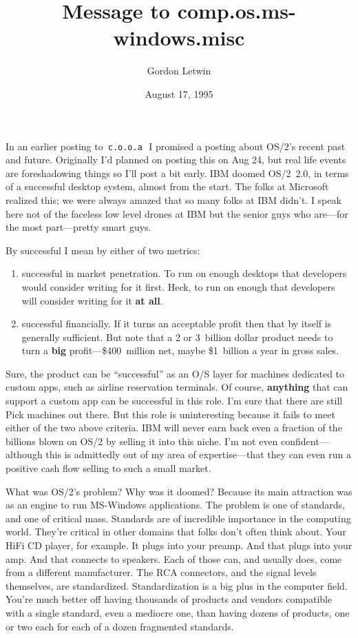 \documentclass[12pt,letterpaper]{article}
\title{Message to comp.os.ms-windows.misc}
\author{Gordon Letwin}
\date{August 17, 1995}
\newcommand{\newsgrp}{\,\texttt{c.o.o.a}\,}
\newcommand{\acro}[1]{{\small\MakeUppercase#1\spacefactor1000}}
\begin{document}
\maketitle

In an earlier posting to \newsgrp\ I promised a posting about \acro{OS/2}'s
recent past and future.  Originally I'd planned on posting this on Aug 24,
but real life events are foreshadowing things so I'll post a bit early.
\acro{IBM} doomed \acro{OS/2}~2.0, in terms of a successful desktop system, almost from
the start.  The folks at Microsoft realized this; we were always amazed
that so many folks at \acro{IBM} didn't.  I speak here not of the faceless low
level drones at \acro{IBM} but the senior guys who are---for the most part---pretty
smart guys.

By successful I mean by either of two metrics:
\begin{enumerate}
\item successful in market penetration.  To run on enough desktops        
                that developers would consider writing for it first.
                Heck, to run on enough that developers will consider writing
                for it {\bfseries at all}.
\item successful financially.  If it turns an acceptable profit then
                that by itself is generally sufficient.  But note that a
                2 or 3~billion dollar product needs to turn a {\bfseries big}
                profit---\$400~million net, maybe \$1~billion a year in
                gross sales.
\end{enumerate}
Sure, the product can be ``successful'' as an O/S layer for machines dedicated
to custom apps, such as airline reservation terminals.  Of course, 
{\bfseries anything} that can support a custom app can be successful in this role.  
I'm sure that there are still Pick machines out there.  But this role
is uninteresting because it fails to meet either of the two above criteria.
\acro{IBM} will never earn back even a fraction of the billions blown on \acro{OS/2}
by selling it into this niche.  I'm not even confident---although this
is admittedly out of my area of expertise---that they can even run a 
positive cash flow selling to such a small market.

What was \acro{OS/2}'s problem?  Why was it doomed?  Because its main attraction
was as an engine to run MS-Windows applications.  The problem is one of
standards, and one of critical mass.  Standards are of incredible importance
in the computing world.  They're critical in other domains that folks
don't often think about.  Your HiFi CD player, for example.  It plugs into
your preamp.  And that plugs into your amp.  And that connects to speakers.
Each of those can, and usually does, come from a different manufacturer.
The \acro{RCA} connectors, and the signal levels themselves, are standardized.
Standardization is a big plus in the computer field.  You're much better off
having thousands of products and vendors compatible with a single standard,
even a mediocre one, than having dozens of products, one or two each for
each of a dozen fragmented standards.
\end{document}
